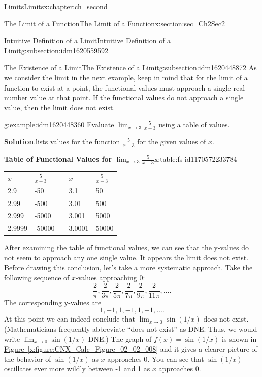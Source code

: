 \documentclass[oneside,10pt,]{book}
\newcommand{\blocktitlefont}{\relax}
\newcommand{\tabularfont}{\relax}
\newcommand{\xreffont}{\relax}
\numberwithin{equation}{section}
\begin{document}
\begin{chapterptx}{Limits}{}{Limits}{}{}{x:chapter:ch_second}
\begin{sectionptx}{The Limit of a Function}{}{The Limit of a Function}{}{}{x:section:sec_Ch2Sec2}
\begin{subsectionptx}{Intuitive Definition of a Limit}{}{Intuitive Definition of a Limit}{}{}{g:subsection:idm1620559592}
\end{subsectionptx}
%
%
\typeout{************************************************}
\typeout{************************************************}
%
\begin{subsectionptx}{The Existence of a Limit}{}{The Existence of a Limit}{}{}{g:subsection:idm1620448872}
As we consider the limit in the next example, keep in mind that for the limit of a function to exist at a point, the functional values must approach a single real-number value at that point. If the functional values do not approach a single value, then the limit does not exist.%
\begin{example}{}{g:example:idm1620448360}%
Evaluate \(\lim_{x\to 3}\frac{5}{x-3}\) using a table of values.%
\par\smallskip%
\noindent\textbf{\blocktitlefont Solution}.\hypertarget{g:solution:idm1620441832}{}\quad{}lists values for the function \(\frac{5}{x-3}\) for the given values of \(x\).%
\begin{tableptx}{\textbf{Table of Functional Values for \(\lim_{x\to3}\frac{5}{x-3}\)}}{x:table:fs-id1170572233784}{}%
\centering%
{\tabularfont%
\begin{tabular}{lllll}
\textbf{\(x\)}&\textbf{\(\frac{5}{x-3}\)}&\textbf{}&\textbf{\(x\)}&\textbf{\(\frac{5}{x-3}\)}\tabularnewline[0pt]
2.9&-50&&3.1&50\tabularnewline[0pt]
2.99&-500&&3.01&500\tabularnewline[0pt]
2.999&-5000&&3.001&5000\tabularnewline[0pt]
2.9999&-50000&&3.0001&50000
\end{tabular}
}%
\end{tableptx}%
After examining the table of functional values, we can see that the y-values do not seem to approach any one single value. It appears the limit does not exist. Before drawing this conclusion, let’s take a more systematic approach. Take the following sequence of \(x\)-values approaching 0:%
%
\begin{equation*}
\frac{2}{\pi}, \frac{2}{3\pi}, \frac{2}{5\pi}, \frac{2}{7\pi}, \frac{2}{9\pi},\frac{2}{11\pi}, \dots .
\end{equation*}
The corresponding y-values are%
%
\begin{equation*}
1,-1,1,-1,1,-1, \dots .
\end{equation*}
At this point we can indeed conclude that \(\lim_{x\to0}\sin (1/x)\) does not exist. (Mathematicians frequently abbreviate “does not exist” as DNE. Thus, we would write \(\lim_{x\to0}\sin (1/x)\) DNE.) The graph of \(f(x)=\sin (1/x)\) is shown in \hyperref[x:figure:CNX_Calc_Figure_02_02_008]{Figure~{\xreffont\ref{x:figure:CNX_Calc_Figure_02_02_008}}} and it gives a clearer picture of the behavior of \(\sin(1/x)\) as \(x\) approaches 0. You can see that \(\sin(1/x)\) oscillates ever more wildly between -1 and 1 as \(x\) approaches 0.%

\end{example}
\end{subsectionptx}
\end{sectionptx}
\end{chapterptx}
\end{document}

